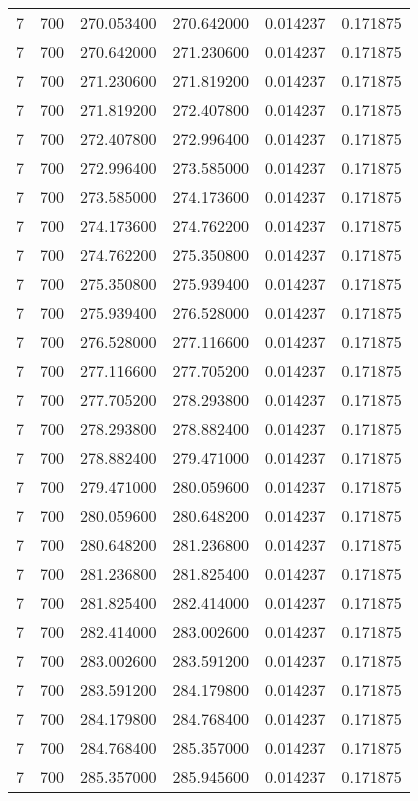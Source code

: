 \begin{longtable}{rrrrrr}
7 & 700 & 270.053400 & 270.642000 & 0.014237 & 0.171875 \\
7 & 700 & 270.642000 & 271.230600 & 0.014237 & 0.171875 \\
7 & 700 & 271.230600 & 271.819200 & 0.014237 & 0.171875 \\
7 & 700 & 271.819200 & 272.407800 & 0.014237 & 0.171875 \\
7 & 700 & 272.407800 & 272.996400 & 0.014237 & 0.171875 \\
7 & 700 & 272.996400 & 273.585000 & 0.014237 & 0.171875 \\
7 & 700 & 273.585000 & 274.173600 & 0.014237 & 0.171875 \\
7 & 700 & 274.173600 & 274.762200 & 0.014237 & 0.171875 \\
7 & 700 & 274.762200 & 275.350800 & 0.014237 & 0.171875 \\
7 & 700 & 275.350800 & 275.939400 & 0.014237 & 0.171875 \\
7 & 700 & 275.939400 & 276.528000 & 0.014237 & 0.171875 \\
7 & 700 & 276.528000 & 277.116600 & 0.014237 & 0.171875 \\
7 & 700 & 277.116600 & 277.705200 & 0.014237 & 0.171875 \\
7 & 700 & 277.705200 & 278.293800 & 0.014237 & 0.171875 \\
7 & 700 & 278.293800 & 278.882400 & 0.014237 & 0.171875 \\
7 & 700 & 278.882400 & 279.471000 & 0.014237 & 0.171875 \\
7 & 700 & 279.471000 & 280.059600 & 0.014237 & 0.171875 \\
7 & 700 & 280.059600 & 280.648200 & 0.014237 & 0.171875 \\
7 & 700 & 280.648200 & 281.236800 & 0.014237 & 0.171875 \\
7 & 700 & 281.236800 & 281.825400 & 0.014237 & 0.171875 \\
7 & 700 & 281.825400 & 282.414000 & 0.014237 & 0.171875 \\
7 & 700 & 282.414000 & 283.002600 & 0.014237 & 0.171875 \\
7 & 700 & 283.002600 & 283.591200 & 0.014237 & 0.171875 \\
7 & 700 & 283.591200 & 284.179800 & 0.014237 & 0.171875 \\
7 & 700 & 284.179800 & 284.768400 & 0.014237 & 0.171875 \\
7 & 700 & 284.768400 & 285.357000 & 0.014237 & 0.171875 \\
7 & 700 & 285.357000 & 285.945600 & 0.014237 & 0.171875 \\

\end{longtable}
